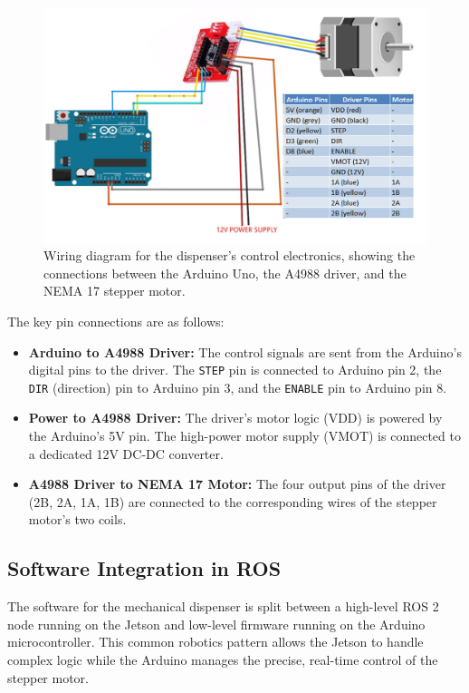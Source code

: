 \begin{figure}[h!]
    \centering
    \includegraphics[width=\linewidth]{figures/stepper.png}
    \caption{Wiring diagram for the dispenser's control electronics, showing the connections between the Arduino Uno, the A4988 driver, and the NEMA 17 stepper motor.}
    \label{fig:stepper_wiring}
\end{figure}

The key pin connections are as follows:
\begin{itemize}
    \item \textbf{Arduino to A4988 Driver:} The control signals are sent from the Arduino's digital pins to the driver. The \texttt{STEP} pin is connected to Arduino pin 2, the \texttt{DIR} (direction) pin to Arduino pin 3, and the \texttt{ENABLE} pin to Arduino pin 8.
    \item \textbf{Power to A4988 Driver:} The driver's motor logic (VDD) is powered by the Arduino's 5V pin. The high-power motor supply (VMOT) is connected to a dedicated 12V DC-DC converter.
    \item \textbf{A4988 Driver to NEMA 17 Motor:} The four output pins of the driver (2B, 2A, 1A, 1B) are connected to the corresponding wires of the stepper motor's two coils.
\end{itemize}

\subsection{Software Integration in ROS}
\label{ssec:dispenser_software}
The software for the mechanical dispenser is split between a high-level ROS 2 node running on the Jetson and low-level firmware running on the Arduino microcontroller. This common robotics pattern allows the Jetson to handle complex logic while the Arduino manages the precise, real-time control of the stepper motor.

